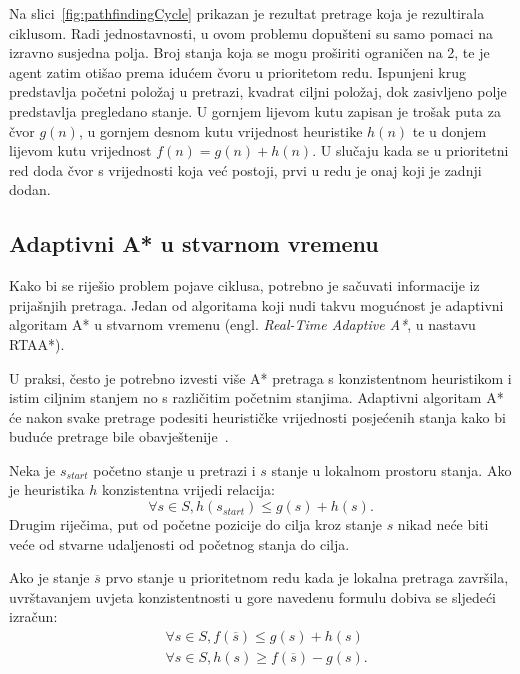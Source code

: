 \documentclass[times, utf8, zavrsni, numeric]{fer}
\begin{document}
\par Na slici~\ref{fig:pathfindingCycle} prikazan je rezultat pretrage koja je rezultirala ciklusom. 
Radi jednostavnosti, u ovom problemu dopušteni su samo pomaci na izravno susjedna polja.
Broj stanja koja se mogu proširiti ograničen na 2, te je agent zatim otišao prema idućem čvoru u prioritetom redu. 
Ispunjeni krug predstavlja početni položaj u pretrazi, kvadrat ciljni položaj, dok zasivljeno polje predstavlja pregledano stanje. 
U gornjem lijevom kutu zapisan je trošak puta za čvor \(g(n)\), u gornjem desnom kutu vrijednost heuristike \(h(n)\) te u donjem lijevom kutu vrijednost \(f(n) = g(n) + h(n)\).
U slučaju kada se u prioritetni red doda čvor s vrijednosti koja već postoji, prvi u redu je onaj koji je zadnji dodan.

\subsection{Adaptivni A* u stvarnom vremenu}\label{ssec:rtaastar}

\par Kako bi se riješio problem pojave ciklusa, potrebno je sačuvati informacije iz prijašnjih pretraga.
Jedan od algoritama koji nudi takvu mogućnost je adaptivni algoritam A* u stvarnom vremenu (engl. \textit{Real-Time Adaptive A*}, u nastavu RTAA*).

\par U praksi, često je potrebno izvesti više A* pretraga s konzistentnom heuristikom i istim ciljnim stanjem no s različitim početnim stanjima. Adaptivni algoritam A* će nakon svake pretrage podesiti heurističke vrijednosti posjećenih stanja kako bi buduće pretrage bile obavještenije~\cite{article:RTAAStar}.

\par Neka je \(s_{start}\) početno stanje u pretrazi i \(s\) stanje u lokalnom prostoru stanja. Ako je heuristika \(h\) konzistentna vrijedi relacija:
\begin{equation}
\forall s \in S, h(s_{start}) \leq g(s) + h(s).
\end{equation}
Drugim riječima, put od početne pozicije do cilja kroz stanje \(s\) nikad neće biti veće od stvarne udaljenosti od početnog stanja do cilja.

\par Ako je stanje \(\overline{s}\) prvo stanje u prioritetnom redu kada je lokalna pretraga završila, uvrštavanjem uvjeta konzistentnosti u gore navedenu formulu dobiva se sljedeći izračun:
\begin{equation}
\begin{aligned}
& \forall s \in S, f(\overline{s}) \leq g(s) + h(s)\\
& \forall s \in S, h(s) \geq f(\overline{s}) - g(s).
\end{aligned}
\end{equation}
\end{document}
